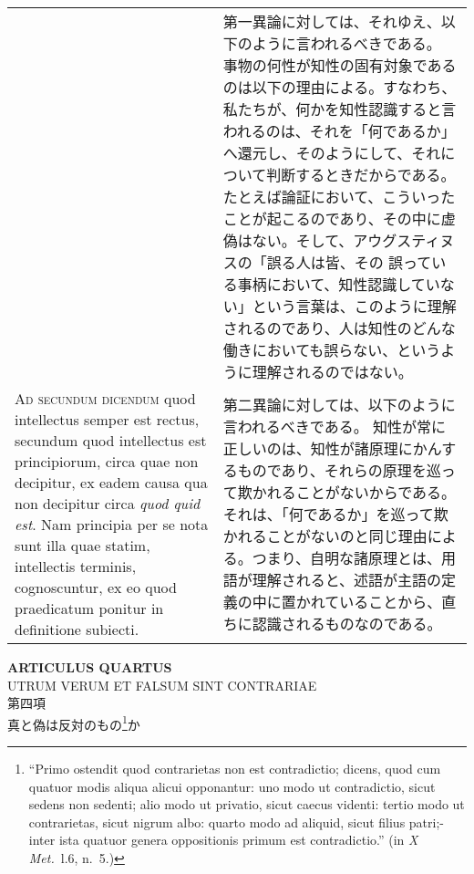 \documentclass[10pt]{jsarticle} %
\begin{document}
\begin{longtable}{p{21em}p{21em}}
&

第一異論に対しては、それゆえ、以下のように言われるべきである。
事物の何性が知性の固有対象であるのは以下の理由による。すなわち、私たちが、何かを知性認識すると言われるのは、それを「何であるか」へ還元し、そのようにして、それについて判断するときだからである。たとえば論証において、こういったことが起こるのであり、その中に虚偽はない。そして、アウグスティヌスの「誤る人は皆、その 誤っている事柄において、知性認識していない」という言葉は、このように理解されるのであり、人は知性のどんな働きにおいても誤らない、というように理解されるのではない。

\\


{\scshape Ad secundum dicendum} quod intellectus semper
est rectus, secundum quod intellectus est principiorum, circa quae non
decipitur, ex eadem causa qua non decipitur circa {\itshape quod quid est}. Nam
principia per se nota sunt illa quae statim, intellectis terminis,
cognoscuntur, ex eo quod praedicatum ponitur in definitione subiecti.


&

第二異論に対しては、以下のように言われるべきである。
知性が常に正しいのは、知性が諸原理にかんするものであり、それらの原理を巡って欺かれることがないからである。それは、「何であるか」を巡って欺かれることがないのと同じ理由による。つまり、自明な諸原理とは、用語が理解されると、述語が主語の定義の中に置かれていることから、直ちに認識されるものなのである。



\end{longtable}
\newpage





\begin{center}
 {\Large {\bf ARTICULUS QUARTUS}}\\
 {\large UTRUM VERUM ET FALSUM SINT CONTRARIAE}\\

 {\Large 第四項\\真と偽は反対のもの\footnote
{ ``Primo ostendit quod contrarietas non est contradictio; dicens, quod cum quatuor modis aliqua alicui opponantur: uno modo ut contradictio, sicut sedens non sedenti; alio modo ut privatio, sicut caecus videnti: tertio modo ut contrarietas, sicut nigrum albo: quarto modo ad aliquid, sicut filius patri;- inter ista quatuor genera oppositionis primum est contradictio.'' (in {\itshape X Met.}~l.6, n.~5.)
}か}
\end{center}
\end{document}
